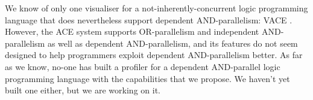 We know of only one visualiser
for a not-inherently-concurrent logic programming language
that does nevertheless support dependent AND-parallelism: VACE \citep{vace}.
However, the ACE system supports
OR-parallelism and independent AND-parallelism
as well as dependent AND-parallelism,
and its features do not seem designed
to help programmers exploit dependent AND-parallelism better.
As far as we know, no-one has built a profiler
for a dependent AND-parallel logic programming language
with the capabilities that we propose.
We haven't yet built one either,
but we are working on it.





